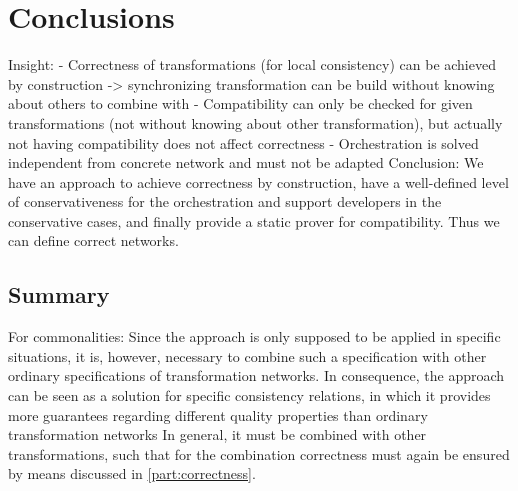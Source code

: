\chapter{Conclusions
}
\label{chap:conclusions}

Insight:
- Correctness of transformations (for local consistency) can be achieved by construction -> synchronizing transformation can be build without knowing about others to combine with
- Compatibility can only be checked for given transformations (not without knowing about other transformation), but actually not having compatibility does not affect correctness
- Orchestration is solved independent from concrete network and must not be adapted
Conclusion: We have an approach to achieve correctness by construction, have a well-defined level of conservativeness for the orchestration and support developers in the conservative cases, and finally provide a static prover for compatibility. Thus we can define correct networks.

\section{Summary}

For commonalities:
Since the approach is only supposed to be applied in specific situations, it is, however, necessary to combine such a specification with other ordinary specifications of transformation networks.
In consequence, the \commonalities approach can be seen as a solution for specific consistency relations, in which it provides more guarantees regarding different quality properties than ordinary transformation networks
In general, it must be combined with other transformations, such that for the combination correctness must again be ensured by means discussed in \autoref{part:correctness}. 


